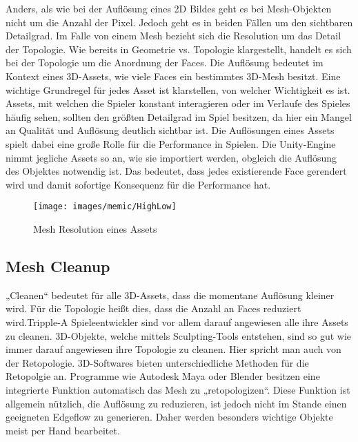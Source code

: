 Anders, als wie bei der Auflösung eines 2D Bildes geht es bei Mesh-Objekten nicht um die Anzahl der Pixel. Jedoch geht es in beiden Fällen um den sichtbaren Detailgrad. Im Falle von einem Mesh bezieht sich die Resolution um das Detail der Topologie. Wie bereits in Geometrie vs. Topologie klargestellt, handelt es sich bei der Topologie um die Anordnung der Faces. Die Auflösung bedeutet im Kontext eines 3D-Assets, wie viele Faces ein bestimmtes 3D-Mesh besitzt. Eine wichtige Grundregel für jedes Asset ist klarstellen, von welcher Wichtigkeit es ist. Assets, mit welchen die Spieler konstant interagieren oder im Verlaufe des Spieles häufig sehen, sollten den größten Detailgrad im Spiel besitzen, da hier ein Mangel an Qualität und Auflösung deutlich sichtbar ist. Die Auflösungen eines Assets spielt dabei eine große Rolle für die Performance in Spielen. Die Unity-Engine nimmt jegliche Assets so an, wie sie importiert werden, obgleich die Auflösung des Objektes notwendig ist. Das bedeutet, dass jedes existierende Face gerendert wird und damit sofortige Konsequenz für die Performance hat.\cite[16]{_3d_modeling_pipline}

\begin{figure}[H]
	\centering
	\texttt{[image: images/memic/HighLow]}
	\caption{Mesh Resolution eines Assets}
\end{figure}
\cite{_meshResolution}

\subsection{Mesh Cleanup}

„Cleanen“ bedeutet für alle 3D-Assets, dass die momentane Auflösung kleiner wird. Für die Topologie heißt dies, dass die Anzahl an Faces reduziert wird.\cite[S.152]{_unity_game_optimization}Tripple-A Spieleentwickler sind vor allem darauf angewiesen alle ihre Assets zu cleanen. 3D-Objekte, welche mittels Sculpting-Tools entstehen, sind so gut wie immer darauf angewiesen ihre Topologie zu cleanen.\cite[S.14]{_3d_modeling_pipline} Hier spricht man auch von der Retopologie. 3D-Softwares bieten unterschiedliche Methoden für die Retopolgie an. Programme wie Autodesk Maya oder Blender besitzen eine integrierte Funktion automatisch das Mesh zu „retopologizen“. Diese Funktion ist allgemein nützlich, die Auflösung zu reduzieren, ist jedoch nicht im Stande einen geeigneten Edgeflow zu generieren.\cite[S.15]{_3d_modeling_pipline} Daher werden besonders wichtige Objekte meist per Hand bearbeitet. 

